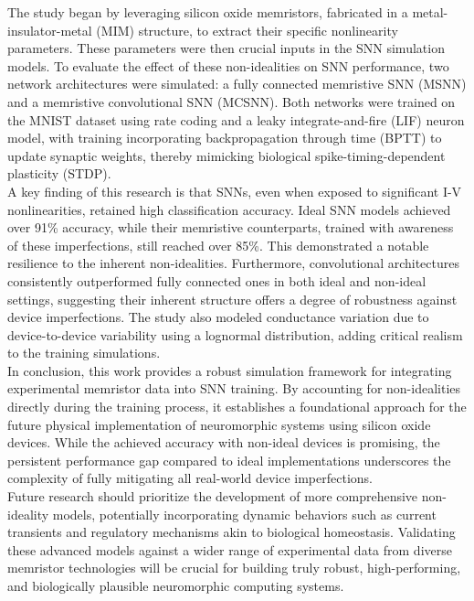 \noindent The study began by leveraging silicon oxide memristors, fabricated in a metal-insulator-metal (MIM) structure, to extract their specific nonlinearity parameters. These parameters were then crucial inputs in the SNN simulation models. To evaluate the effect of these non-idealities on SNN performance, two network architectures were simulated: a fully connected memristive SNN (MSNN) and a memristive convolutional SNN (MCSNN). Both networks were trained on the MNIST dataset using rate coding and a leaky integrate-and-fire (LIF) neuron model, with training incorporating backpropagation through time (BPTT) to update synaptic weights, thereby mimicking biological spike-timing-dependent plasticity (STDP). \\

\noindent A key finding of this research is that SNNs, even when exposed to significant I-V nonlinearities, retained high classification accuracy. Ideal SNN models achieved over 91\% accuracy, while their memristive counterparts, trained with awareness of these imperfections, still reached over 85\%. This demonstrated a notable resilience to the inherent non-idealities. Furthermore, convolutional architectures consistently outperformed fully connected ones in both ideal and non-ideal settings, suggesting their inherent structure offers a degree of robustness against device imperfections. The study also modeled conductance variation due to device-to-device variability using a lognormal distribution, adding critical realism to the training simulations.\\

\noindent In conclusion, this work provides a robust simulation framework for integrating experimental memristor data into SNN training. By accounting for non-idealities directly during the training process, it establishes a foundational approach for the future physical implementation of neuromorphic systems using silicon oxide devices. While the achieved accuracy with non-ideal devices is promising, the persistent performance gap compared to ideal implementations underscores the complexity of fully mitigating all real-world device imperfections.\\

\noindent Future research should prioritize the development of more comprehensive non-ideality models, potentially incorporating dynamic behaviors such as current transients and regulatory mechanisms akin to biological homeostasis. Validating these advanced models against a wider range of experimental data from diverse memristor technologies will be crucial for building truly robust, high-performing, and biologically plausible neuromorphic computing systems.